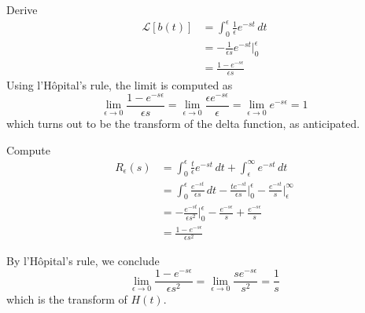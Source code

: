 \documentclass[a4paper]{article}
\begin{document}
Derive
\begin{align*}
	\mathcal{L}\!\left[ b \!\left( t \right) \right] & = \int^{\epsilon}_{0} \frac{1}{\epsilon}e^{-st} \, dt \\
	 & = -\frac{1}{\epsilon s}e^{-st} \Big|^{\epsilon}_{0} \\ 
	 & = \frac{1 - e^{-s \epsilon}}{\epsilon s}
\end{align*}
Using l'H\^opital's rule, the limit is computed as 
\[
	\lim\limits_{\epsilon \to 0} \frac{1 - e^{-s \epsilon}}{\epsilon s} = \lim\limits_{\epsilon \to 0} \frac{\epsilon e^{-s \epsilon}}{\epsilon} = \lim\limits_{\epsilon \to 0} e^{-s \epsilon} = 1
\]
which turns out to be the transform of the delta function, as anticipated.

\vspace{12pt}


Compute
\begin{align*}
	R_{\epsilon}\!\left( s \right) & = \int^{\epsilon}_{0} \frac{t}{\epsilon} e^{-st} \, dt + \int^{\infty}_{\epsilon} e^{-st} \, dt \\
	 & = \int^{\epsilon}_{0} \frac{e^{-st}}{\epsilon s} \, dt - \frac{te^{-st}}{\epsilon s} \Big|^{\epsilon}_{0} - \frac{e^{-st}}{s} \Big|^{\infty}_{\epsilon} \\
	 & = -\frac{e^{-st}}{\epsilon s^{2}} \Big|^{\epsilon}_{0} - \frac{e^{-s \epsilon}}{s} + \frac{e^{-s \epsilon}}{s} \\
	 & = \frac{1 - e^{-s \epsilon}}{\epsilon s^{2}}
\end{align*}

By l'H\^opital's rule, we conclude
\[
	\lim\limits_{\epsilon \to 0} \frac{1 - e^{-s \epsilon}}{\epsilon s^{2}} = \lim\limits_{\epsilon \to 0} \frac{se^{-s \epsilon}}{s^{2}} = \frac{1}{s} 
\]
which is the transform of \( H \!\left( t \right) \).

\vspace{12pt}

\end{document}
